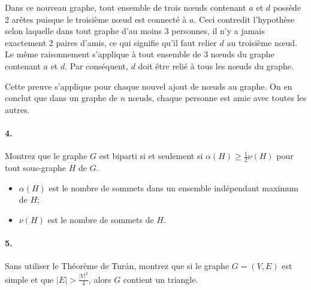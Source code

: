 \begin{solution}
Dans ce nouveau graphe, tout ensemble de trois nœuds contenant $a$ et $d$ possède 2 arêtes puisque le troisième nœud est connecté à $a$. Ceci contredit l'hypothèse selon laquelle dans tout graphe d'au moins 3 personnes, il n'y a jamais exactement 2 paires d'amis, ce qui signifie qu'il faut relier $d$ au troisième nœud. Le même raisonnement s'applique à tout ensemble de 3 nœuds du graphe contenant $a$ et $d$. Par conséquent, $d$ doit être relié à tous les nœuds du graphe.

\begin{center}
\end{center}

Cette preuve s'applique pour chaque nouvel ajout de nœuds au graphe. On en conclut que dans un graphe de $n$ nœuds, chaque personne est amie avec toutes les autres.
\end{solution}

\paragraph{4. } Montrez que le graphe $G$ est biparti si et seulement si $\alpha(H) \geq \frac{1}{2} \nu(H)$ pour tout sous-graphe $H$ de $G$.
\begin{itemize}
  \item $\alpha(H)$ est le nombre de sommets dans un ensemble indépendant maximum de $H$;
  \item $\nu(H)$ est le nombre de sommets de $H$.
\end{itemize}


\paragraph{5. } Sans utiliser le Théorème de Turán, montrez que si le graphe $G = (V, E)$ est simple et que $|E| > \frac{|V|^2}{4}$, alors $G$ contient un triangle.
